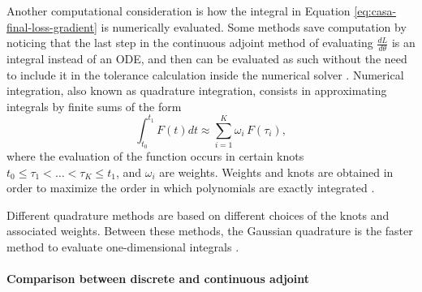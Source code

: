 Another computational consideration is how the integral in Equation \eqref{eq:casa-final-loss-gradient} is numerically evaluated. 
Some methods save computation by noticing that the last step in the continuous adjoint method of evaluating $\frac{dL}{d\theta}$ is an integral instead of an ODE, and then can be evaluated as such without the need to include it in the tolerance calculation inside the numerical solver \cite{that-is-not-an-ode}.
Numerical integration, also known as quadrature integration, consists in approximating integrals by finite sums of the form
\begin{equation}
    \int_{t_0}^{t_1} 
    F(t) dt
    \approx
    \sum_{i=1}^K \omega_i \, F(\tau_i),
\end{equation}
where the evaluation of the function occurs in certain knots $t_0 \leq \tau_1 < \ldots < \tau_K \leq t_1$, and $\omega_i$ are weights. 
Weights and knots are obtained in order to maximize the order in which polynomials are exactly integrated \cite{stoer2002-numerical}. 

Different quadrature methods are based on different choices of the knots and associated weights.
Between these methods, the Gaussian quadrature is the faster method to evaluate one-dimensional integrals \cite{Norcliffe_gaussquadrature_2023}.

\paragraph{Comparison between discrete and continuous adjoint}
